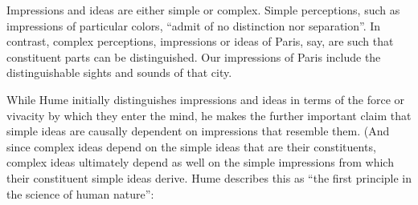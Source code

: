 Impressions and ideas are either simple or complex. Simple perceptions, such as impressions of particular colors, ``admit of no distinction nor separation''. In contrast, complex perceptions, impressions or ideas of Paris, say, are such that constituent parts can be distinguished. Our impressions of Paris include the distinguishable sights and sounds of that city. \change

% 


While Hume initially distinguishes impressions and ideas in terms of the force or vivacity by which they enter the mind, he makes the further important claim that simple ideas are causally dependent on impressions that resemble them. (And since complex ideas depend on the simple ideas that are their constituents, complex ideas ultimately depend as well on the simple impressions from which their constituent simple ideas derive. Hume describes this as ``the first principle in the science of human nature'':

